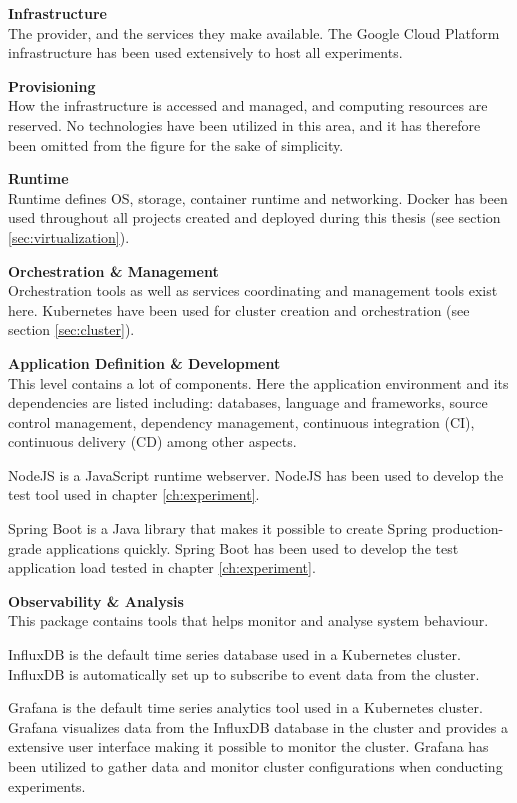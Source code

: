 \textbf{Infrastructure} \\
The provider, and the services they make available. The Google Cloud Platform infrastructure has been used extensively to host all experiments.

\textbf{Provisioning}\\ 
How the infrastructure is accessed and managed, and computing resources are reserved. No technologies have been utilized in this area, and it has therefore been omitted from the figure for the sake of simplicity.
 
\textbf{Runtime}\\
Runtime defines OS, storage, container runtime and networking. Docker has been used throughout all projects created and deployed during this thesis (see section \ref{sec:virtualization}).
 
\textbf{Orchestration \& Management}\\
Orchestration tools as well as services coordinating and management tools exist here. Kubernetes have been used for cluster creation and orchestration (see section \ref{sec:cluster}).
 
\textbf{Application Definition \& Development}\\
This level contains a lot of components. Here the application environment and its dependencies are listed including: databases, language and frameworks, source control management, dependency management, continuous integration (CI), continuous delivery (CD) among other aspects.

NodeJS is a JavaScript runtime webserver. NodeJS has been used to develop the test tool used in chapter \ref{ch:experiment}.

Spring Boot is a Java library that makes it possible to create Spring production-grade applications quickly. Spring Boot has been used to develop the test application load tested in chapter \ref{ch:experiment}.

\textbf{Observability \& Analysis}\\
This package contains tools that helps monitor and analyse system behaviour.

InfluxDB is the default time series database used in a Kubernetes cluster. InfluxDB is automatically set up to subscribe to event data from the cluster.

Grafana is the default time series analytics tool used in a Kubernetes cluster. Grafana visualizes data from the InfluxDB database in the cluster and provides a extensive user interface making it possible to monitor the cluster. Grafana has been utilized to gather data and monitor cluster configurations when conducting experiments.

